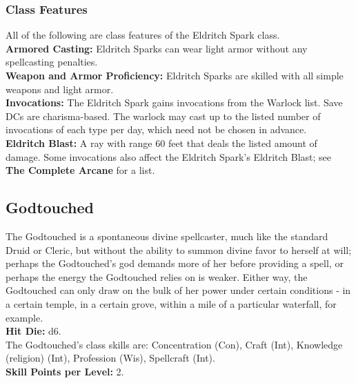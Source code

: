 \documentclass[11pt]{report}
\begin{document}
\subsubsection{Class Features}
All of the following are class features of the Eldritch Spark class. \\
\textbf{Armored Casting:} Eldritch Sparks can wear light armor without any
spellcasting penalties. \\
\textbf{Weapon and Armor Proficiency:} Eldritch Sparks are skilled with all
simple weapons and light armor. \\
\textbf{Invocations:} The Eldritch Spark gains invocations from the Warlock
list. Save DCs are charisma-based. The warlock may cast up to the listed number
of invocations of each type per day, which need not be chosen in advance. \\
\textbf{Eldritch Blast:} A ray with range 60 feet that deals the listed amount
of damage. Some invocations also affect the Eldritch Spark's Eldritch Blast; see
\textbf{The Complete Arcane} for a list.

\subsection{Godtouched}
The Godtouched is a spontaneous divine spellcaster, much like the standard Druid
or Cleric, but without the ability to summon divine favor to herself at will;
perhaps the Godtouched's god demands more of her before providing a spell, or
perhaps the energy the Godtouched relies on is weaker. Either way, the
Godtouched can only draw on the bulk of her power under certain conditions - in
a certain temple, in a certain grove, within a mile of a particular waterfall,
for example. \\

\textbf{Hit Die:} d6. \\
The Godtouched's class skills are: Concentration (Con), Craft (Int), Knowledge
(religion) (Int), Profession (Wis), Spellcraft (Int). \\
\textbf{Skill Points per Level:} 2.
\end{document}
